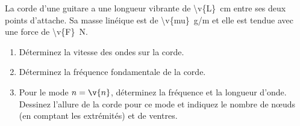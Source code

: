 La corde d'une guitare a une longueur vibrante de \qty{\v{L}}{cm} entre ses deux points d'attache. Sa masse linéique est de \qty{\v{mu}}{g/m} et elle est tendue avec une force de \qty{\v{F}}{N}.

\begin{enumerate}[label=\alph*)]
    \item Déterminez la vitesse des ondes sur la corde.
    \item Déterminez la fréquence fondamentale de la corde.
    \item Pour le mode $n = \v{n}$, déterminez la fréquence et la longueur d'onde. Dessinez l'allure de la corde pour ce mode et indiquez le nombre de nœuds (en comptant les extrémités) et de ventres.
\end{enumerate}
